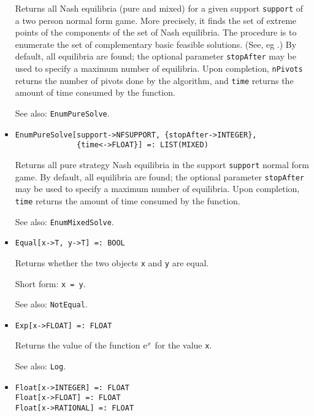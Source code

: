 \begin{itemize}
\bd
Returns all Nash equilibria (pure and mixed) for a given support
\verb+support+ of a two person normal form game.  More precisely, it
finds the set of extreme points of the components of the set of Nash
equilibria.  The procedure is to enumerate the set of complementary
basic feasible solutions. (See, eg \cite[1964]{Man:64}.)  By default,
all equilibria are found; the optional parameter \verb+stopAfter+ may
be used to specify a maximum number of equilibria.  Upon completion,
\verb+nPivots+ returns the number of pivots done by the algorithm, and
\verb+time+ returns the amount of time consumed by the function.
\item
[See also:] {\tt EnumPureSolve}.
\ed

\item
\protect \large \begin{verbatim}
EnumPureSolve[support->NFSUPPORT, {stopAfter->INTEGER}, 
              {time<->FLOAT}] =: LIST(MIXED) 
\end{verbatim}\normalsize

\bd
Returns all pure strategy Nash equilibria in the support \verb+support+
normal form game.  By default, all equilibria are found; the optional
parameter \verb+stopAfter+ may be used to specify a maximum number of
equilibria.  Upon completion, \verb+time+ returns the amount of time
consumed by the function. 
\item
[See also:] {\tt EnumMixedSolve}.
\ed

\item
\protect \large \begin{verbatim}
Equal[x->T, y->T] =: BOOL
\end{verbatim}\normalsize

\bd
Returns whether the two objects \verb+x+ and \verb+y+ are
equal.
\item
[Short form:] \verb+x = y+.
\item
[See also:] {\tt NotEqual}.
\ed

\item
\protect \large \begin{verbatim}
Exp[x->FLOAT] =: FLOAT
\end{verbatim} \normalsize

\bd
Returns the value of the function ${\rm e}^{x}$ for the
value \verb+x+.
\item
[See also:] {\tt Log}.
\ed



\item
\protect \large \begin{verbatim}
Float[x->INTEGER] =: FLOAT
Float[x->FLOAT] =: FLOAT
Float[x->RATIONAL] =: FLOAT
\end{verbatim} \normalsize


\end{itemize}
